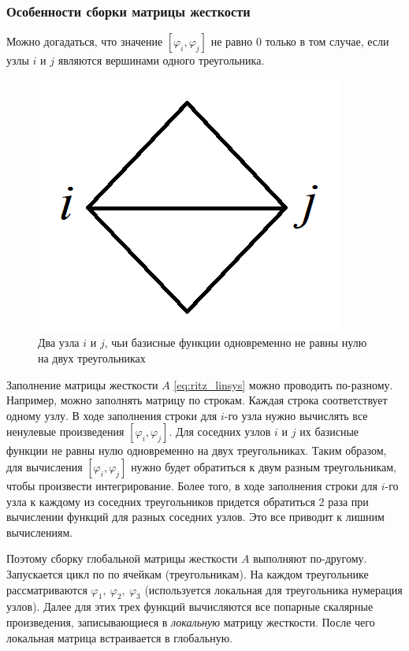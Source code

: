 \documentclass[a4paper, 11pt]{article}
\begin{document}
\subsubsection{Особенности сборки матрицы жесткости}
Можно догадаться, что значение $[\varphi_i, \varphi_j]$ не равно 0 только в том случае, если узлы $i$ и $j$ являются вершинами одного треугольника.  
\begin{figure}[h] \centering
	\includegraphics[scale=0.4]{two_cells}
	\caption{Два узла $i$ и $j$, чьи базисные функции одновременно не равны нулю на двух треугольниках\label{pic:two_cells}}
\end{figure}

Заполнение матрицы жесткости $A$ \eqref{eq:ritz_linsys} можно проводить по-разному. Например, можно заполнять матрицу по строкам. Каждая строка соответствует одному узлу. В ходе заполнения строки для $i$-го узла нужно вычислять все ненулевые произведения $[\varphi_i, \varphi_j]$. Для соседних узлов $i$ и $j$ их базисные функции не равны нулю одновременно на двух треугольниках. Таким образом, для вычисления $[\varphi_i, \varphi_j]$ нужно будет обратиться к двум разным треугольникам, чтобы произвести интегрирование. Более того, в ходе заполнения строки для $i$-го узла к каждому из соседних треугольников придется обратиться 2 раза при вычислении функций для разных соседних узлов. Это все приводит к лишним вычислениям.

Поэтому сборку глобальной матрицы жесткости $A$ выполняют по-другому. Запускается цикл по по ячейкам (треугольникам). На каждом треугольнике рассматриваются $\varphi_1,~\varphi_2,~\varphi_3$ (используется локальная для треугольника нумерация узлов). Далее для этих трех функций вычисляются все попарные скалярные произведения, записывающиеся в \textit{локальную} матрицу жесткости. После чего локальная матрица встраивается в глобальную.
\end{document}
